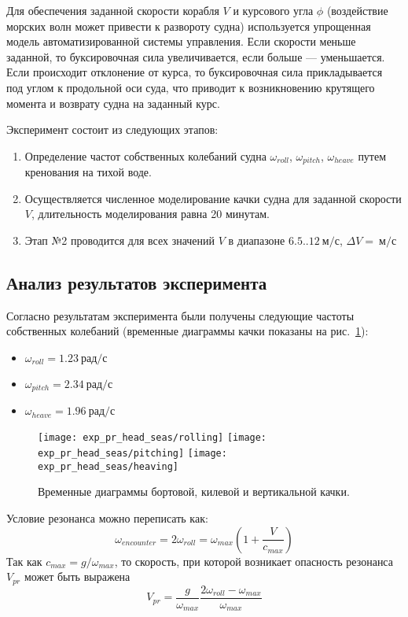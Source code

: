 Для обеспечения заданной скорости корабля $V$ и курсового угла $\phi$ (воздействие морских волн может привести к развороту судна) используется упрощенная модель автоматизированной системы управления. Если скорости меньше заданной, то буксировочная сила увеличивается, если больше --- уменьшается. Если происходит отклонение от курса, то буксировочная сила прикладывается под углом к продольной оси суда, что приводит к возникновению крутящего момента и возврату судна на заданный курс.

Эксперимент состоит из следующих этапов:
\begin{enumerate}
	\item	Определение частот собственных колебаний судна 
			$\omega_{roll}$, $\omega_{pitch}$, $\omega_{heave}$ путем кренования на тихой воде.
	\item	Осуществляется численное моделирование качки судна для заданной скорости $V$, длительность моделирования равна 20 минутам.
	\item	Этап №2	проводится для всех значений $V$ в диапазоне 
			$6.5..12\ \text{м/с}$, $\Delta V=\ \text{м/с}$ 
\end{enumerate}

\subsection{Анализ результатов эксперимента}

Согласно результатам эксперимента были получены следующие частоты собственных колебаний (временные диаграммы качки показаны на рис.~\ref{exp_pr2_rolling}):
\begin{itemize}
	\item	$ \omega_{roll} = 1.23 \ \text{рад/с}$
	\item	$ \omega_{pitch} = 2.34 \ \text{рад/с}$
	\item	$ \omega_{heave} = 1.96 \ \text{рад/с}$
\end{itemize}

\begin{figure}[ht]
	\begin{center}
	\texttt{[image: exp\_pr\_head\_seas/rolling]}
	\texttt{[image: exp\_pr\_head\_seas/pitching]}
	\texttt{[image: exp\_pr\_head\_seas/heaving]}
	\end{center}
	\caption{Временные диаграммы бортовой, килевой и вертикальной качки.}
	\label{exp_pr2_rolling}
\end{figure}

Условие резонанса можно переписать как:
\begin{equation}
	\omega_{encounter} = 2 \omega_{roll} = \omega_{max} \left(  1 + \frac{V}{c_{max}}  \right)
\end{equation}
Так как $c_{max} = g / \omega_{max}$, то скорость, при которой возникает опасность резонанса $V_{pr}$ может быть выражена
\begin{equation}
	V_{pr} = \frac{g}{\omega_{max}} \frac{ 2 \omega_{roll} - \omega_{max} }{ \omega_{max}}
\end{equation}

